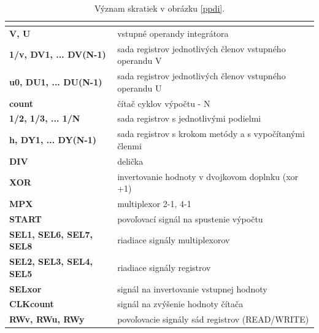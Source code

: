 \begin{table}[H]
\centering
\begin{tabular}{|
>{\columncolor[HTML]{DAE8FC}}l |l|}
\hline
\multicolumn{1}{|c|}{\cellcolor[HTML]{68CBD0}{\color[HTML]{000000} \textbf{Skratka}}} & \multicolumn{1}{c|}{\cellcolor[HTML]{68CBD0}{\color[HTML]{000000} \textbf{Popis}}} \\ \hline
\textbf{V, U} & vstupné operandy integrátora \\ \hline
\textbf{1/v, DV1, ... DV(N-1)} & sada registrov jednotlivých členov vstupného operandu V \\ \hline
\textbf{u0, DU1, ... DU(N-1)} & sada registrov jednotlivých členov vstupného operandu U \\ \hline
\textbf{count} & čítač cyklov výpočtu - N \\ \hline
\textbf{1/2, 1/3, ... 1/N} & sada registrov s jednotlivými podielmi \\ \hline
\textbf{h, DY1, ... DY(N-1)} & sada registrov s krokom metódy a s vypočítanými členmi \\ \hline
\textbf{DIV} & delička \\ \hline
\textbf{XOR} & invertovanie hodnoty v dvojkovom doplnku (xor +1) \\ \hline
\textbf{MPX} & multiplexor 2-1, 4-1 \\ \hline
\textbf{START} & povoľovací signál na spustenie výpočtu \\ \hline
\textbf{SEL1, SEL6, SEL7, SEL8} & riadiace signály multiplexorov \\ \hline
\textbf{SEL2, SEL3, SEL4, SEL5} & riadiace signály registrov \\ \hline
\textbf{SELxor} & signál na invertovanie vstupnej hodnoty \\ \hline
\textbf{CLKcount} & signál na zvýšenie hodnoty čítača \\ \hline
\textbf{RWv, RWu, RWy} & povoľovacie signály sád registrov (READ/WRITE) \\ \hline
\end{tabular}
\caption{Význam skratiek v obrázku \ref{ppdi}.}
\label{my-label}
\end{table}




